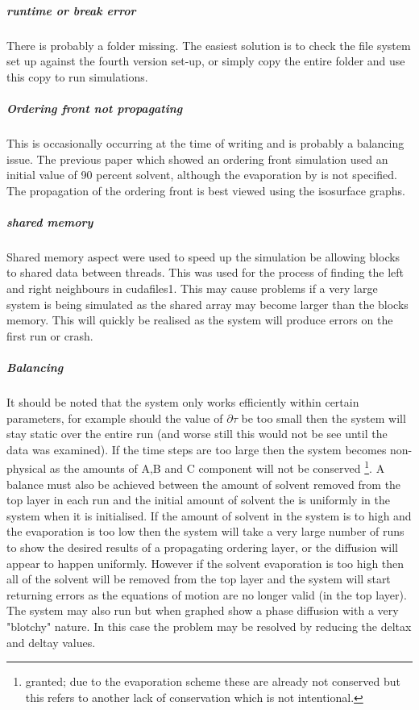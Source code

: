 \documentclass{article}
\numberwithin{equation}{section} %
\begin{document}
\subparagraph{runtime or break error} There is probably a folder missing. The easiest solution is to check the file system set up against the fourth version set-up, or simply copy the entire folder and use this copy to run simulations. 


\subparagraph{Ordering front not propagating} This is occasionally occurring at the time of writing and is probably a balancing issue. The previous paper which showed an ordering front simulation used an initial value of 90 percent solvent, although the evaporation by is not specified. The propagation of the ordering front is best viewed using the isosurface graphs.

\subparagraph{shared memory} Shared memory aspect were used to speed up the simulation be allowing blocks to shared data between threads. This was used for the process of finding the left and right neighbours in cudafiles1. This may cause problems if a very large system is being simulated as the shared array may become larger than the blocks memory. This will quickly be realised as the system will produce errors on the first run or crash. 

\subparagraph{Balancing} It should be noted that the system only works efficiently within certain parameters, for example should the value of $\partial \tau$ be too small then the system will stay static over the entire run (and worse still this would not be see until the data was examined). If the time steps are too large then the system becomes non-physical as the amounts of A,B and C component will not be conserved \footnote{granted; due to the evaporation scheme these are already not conserved but this refers to another lack of conservation which is not intentional.}. A balance must also be achieved between the amount of solvent removed from the top layer in each run and the initial amount of solvent the is uniformly in the system when it is initialised. If the amount of solvent in the system is to high and the evaporation is too low then the system will take a very large number of runs to show the desired results of a propagating ordering layer, or the diffusion will appear to happen uniformly. However if the solvent evaporation is too high then all of the solvent will be removed from the top layer and the system will start returning errors as the equations of motion are no longer valid (in the top layer). \\
The system may also run but when graphed show a phase diffusion with a very "blotchy" nature. In this case the problem may be resolved by reducing the delta\textunderscore x and delta\textunderscore y values. 
\end{document}

